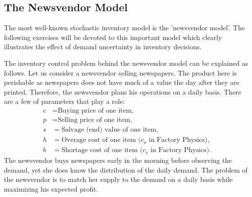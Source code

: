 %
%
%
%
%
%
%

\subsection{The Newsvendor Model}



The most well-known stochastic inventory model is the 'newsvendor model'. The following exercises will be devoted to this important model which clearly illustrates the effect of demand uncertainty in inventory decisions. 

The inventory control problem behind the newsvendor model can be explained as follows. Let us consider a newsvendor selling newspapers. The product here is perishable as newspapers does not have much of a value the day after they are printed. Therefore, the newsvendor plans his operations on a daily basis. There are a few of parameters that play a role: 
\begin{align*}
  c &= \text{Buying price of one item,} \\
  p &= \text{Selling  price of one item,} \\
  s &= \text{Salvage (end) value of one item}, \\
  h &= \text{Overage cost of one item ($c_o$ in Factory Physics)},\\
  b &= \text{Shortage cost of one item ($c_s$ in Factory Physics)}.
\end{align*}
 The newsvendor buys newspapers early in the morning before observing the demand, yet she does know the distribution of the daily demand. The problem of the newsvendor is to match her supply to the demand on a daily basis while maximizing his expected profit.



